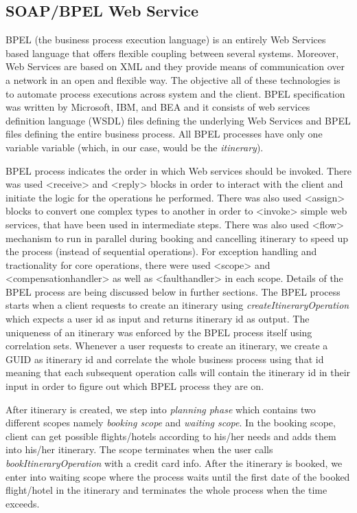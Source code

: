 \subsection{SOAP/BPEL Web Service}

BPEL (the business process execution language) is an entirely Web Services based language that offers flexible coupling between several systems. Moreover,  Web Services are based on XML and they provide means of communication over a network in an open and flexible way. The objective all of these technologies is to automate process executions across system and the client. BPEL specification was written by Microsoft, IBM, and BEA and it consists of web services definition language (WSDL) files defining the underlying Web Services and BPEL files defining the entire business process. All BPEL processes have only one variable variable (which, in our case, would be the \textit{itinerary}). 

BPEL process indicates the order in which Web services should be invoked. There was used <receive> and <reply> blocks in order to interact with the client and initiate the logic for the operations he performed. There was also used <assign> blocks to convert one complex types to another in order to <invoke> simple web services, that have been used in intermediate steps. There was also used <flow> mechanism to run in parallel during booking and cancelling itinerary to speed up the process (instead of sequential operations). For exception handling and tractionality for core operations, there were used <scope> and <compensationhandler> as well as <faulthandler> in each scope. Details of the BPEL process are being discussed below in further sections.
The BPEL process starts when a client requests to create an itinerary using \textit{createItineraryOperation} which expects a user id as input and returns itinerary id as output. The uniqueness of an itinerary was enforced by the BPEL process itself using correlation sets. Whenever a user requests to create an itinerary, we create a GUID as itinerary id and correlate the whole business process using that id meaning that each subsequent operation calls will contain the itinerary id in their input in order to figure out which BPEL process they are on. 

After itinerary is created, we step into \textit{planning phase} which contains two different scopes namely \textit{booking scope} and \textit{waiting scope}. In the booking scope, client can get possible flights/hotels according to his/her needs and adds them into his/her itinerary. The scope terminates when the user calls \textit{bookItineraryOperation} with a credit card info. 
After the itinerary is booked, we enter into waiting scope where the process waits until the first date of the booked flight/hotel in the itinerary and terminates the whole process when the time exceeds.

